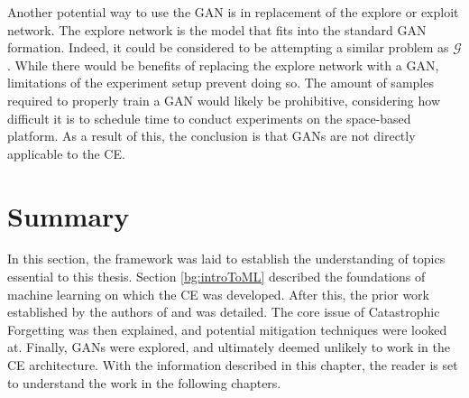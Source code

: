 	\par Another potential way to use the GAN is in replacement of the explore or exploit network. The explore network is the model that fits into the standard GAN formation. Indeed, it could be considered to be attempting a similar problem as $\mathcal{G}$. While there would be benefits of replacing the explore network with a GAN, limitations of the experiment setup prevent doing so. The amount of samples required to properly train a GAN would likely be prohibitive, considering how difficult it is to schedule time to conduct experiments on the space-based platform. As a result of this, the conclusion is that GANs are not directly applicable to the CE.
	
	\section{Summary}
	\par In this section, the framework was laid to establish the understanding of topics essential to this thesis. Section \ref{bg:introToML} described the foundations of machine learning on which the CE was developed. After this, the prior work established by the authors of \cite{tim_implementation_paper} and \cite{paulo_theory_paper} was detailed.  The core issue of Catastrophic Forgetting was then explained, and potential mitigation techniques were looked at. Finally, GANs were explored, and ultimately deemed unlikely to work in the CE architecture. With the information described in this chapter, the reader is set to understand the work in the following chapters. 
